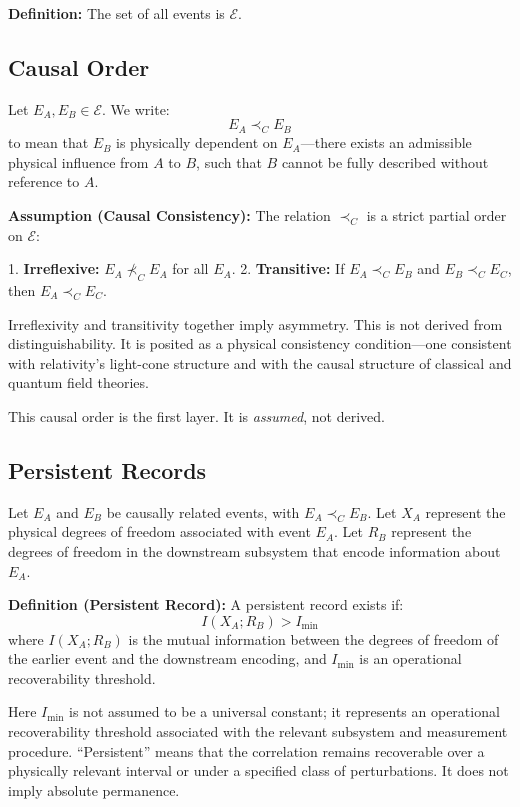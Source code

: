 \documentclass[12pt, a4paper]{article}
\begin{document}
\textbf{Definition:} The set of all events is \( \mathcal{E} \).

\subsection{Causal Order}

Let \( E_A, E_B \in \mathcal{E} \). We write:
\[
E_A \prec_C E_B
\]
to mean that \( E_B \) is physically dependent on \( E_A \)---there exists an admissible physical influence from \( A \) to \( B \), such that \( B \) cannot be fully described without reference to \( A \).

\textbf{Assumption (Causal Consistency):} The relation \( \prec_C \) is a strict partial order on \( \mathcal{E} \):

1. \textbf{Irreflexive:} \( E_A \nprec_C E_A \) for all \( E_A \).
2. \textbf{Transitive:} If \( E_A \prec_C E_B \) and \( E_B \prec_C E_C \), then \( E_A \prec_C E_C \).

Irreflexivity and transitivity together imply asymmetry. This is not derived from distinguishability. It is posited as a physical consistency condition---one consistent with relativity's light-cone structure and with the causal structure of classical and quantum field theories.

This causal order is the first layer. It is \textit{assumed}, not derived.

\subsection{Persistent Records}

Let \( E_A \) and \( E_B \) be causally related events, with \( E_A \prec_C E_B \). Let \( X_A \) represent the physical degrees of freedom associated with event \( E_A \). Let \( R_B \) represent the degrees of freedom in the downstream subsystem that encode information about \( E_A \).

\textbf{Definition (Persistent Record):} A persistent record exists if:
\[
I(X_A; R_B) > I_{\min}
\]
where \( I(X_A; R_B) \) is the mutual information between the degrees of freedom of the earlier event and the downstream encoding, and \( I_{\min} \) is an operational recoverability threshold.

Here \( I_{\min} \) is not assumed to be a universal constant; it represents an operational recoverability threshold associated with the relevant subsystem and measurement procedure. ``Persistent'' means that the correlation remains recoverable over a physically relevant interval or under a specified class of perturbations. It does not imply absolute permanence.
\end{document}
